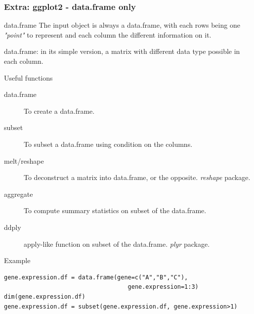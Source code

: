 \documentclass[10pt]{beamer}
\newenvironment{xframe}[2][]
  {\begin{frame}[fragile,environment=xframe,#1]
  \frametitle{#2}}
  {\end{frame}}
\begin{document}
\begin{xframe}[shrink=10]{Extra: {\sf ggplot2} - {\sf data.frame} only}
    \begin{block}{{\sf data.frame}}
    The input object is always a {\sf data.frame}, with each rows being one {\it "point"} to represent and each column the different information on it.
    \medskip
    
    {\small {\sf data.frame}: in its simple version, a {\sf matrix} with different data type possible in each column.}
  \end{block}

  \begin{block}{Useful functions}
    \begin{description}
    \item[data.frame] To create a {\sf data.frame}.
    \item[subset] To subset a {\sf data.frame} using condition on the columns.
    \item[melt/reshape] To deconstruct a matrix into data.frame, or the opposite. {\it reshape} package.
    \item[aggregate] To compute summary statistics on subset of the data.frame.
    \item[ddply] {\sf apply}-like function on subset of the data.frame. {\it plyr} package.
    \end{description}
  \end{block}
  \begin{exampleblock}{Example}
\begin{verbatim}
gene.expression.df = data.frame(gene=c("A","B","C"),
                                   gene.expression=1:3)
dim(gene.expression.df)
gene.expression.df = subset(gene.expression.df, gene.expression>1)
\end{verbatim}  
  \end{exampleblock}
\end{xframe}
\end{document}
